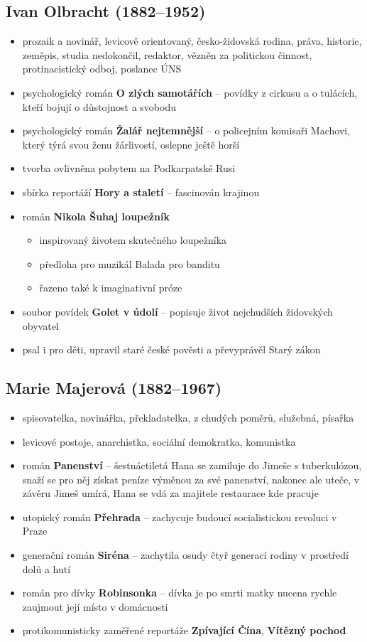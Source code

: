\subsection{Ivan Olbracht (1882--1952)}
\begin{itemize}
\item prozaik a novinář, levicově orientovaný, česko-židovská rodina, práva, historie, zeměpis, studia nedokončil, redaktor, vězněn za politickou činnost, protinacistický odboj, poslanec ÚNS
\item psychologický román \textbf{O zlých samotářích} -- povídky z cirkusu a o tulácích, kteří bojují o důstojnost a svobodu
\item psychologický román \textbf{Žalář nejtemnější} -- o policejním komisaři Machovi, který týrá svou ženu žárlivostí, oslepne \ra ještě horší
\item tvorba ovlivněna pobytem na Podkarpatské Rusi
\item sbírka reportáží \textbf{Hory a staletí} -- fascinován krajinou
\item román \textbf{Nikola Šuhaj loupežník}
	\begin{itemize}
	\item inspirovaný životem skutečného loupežníka
	\item předloha pro muzikál Balada pro banditu
	\item řazeno také k imaginativní próze
	\end{itemize}
\item soubor povídek \textbf{Golet v údolí} -- popisuje život nejchudších židovských obyvatel
\item psal i pro děti, upravil staré české pověsti a převyprávěl Starý zákon
\end{itemize}

\subsection{Marie Majerová (1882--1967)}
\begin{itemize}
\item spisovatelka, novinářka, překladatelka, z chudých poměrů, služebná, písařka
\item levicové postoje, anarchistka, sociální demokratka, komunistka
\item román \textbf{Panenství} -- šestnáctiletá Hana se zamiluje do Jimeše s tuberkulózou, snaží se pro něj získat peníze výměnou za své panenství, nakonec ale uteče, v závěru Jimeš umírá, Hana se vdá za majitele restaurace kde pracuje
\item utopický román \textbf{Přehrada} -- zachycuje budoucí socialistickou revoluci v Praze
\item generační román \textbf{Siréna} -- zachytila osudy čtyř generací rodiny v prostředí dolů a hutí
\item román pro dívky \textbf{Robinsonka} -- dívka je po smrti matky nucena rychle zaujmout její místo v domácnosti
\item protikomunisticky zaměřené reportáže \textbf{Zpívající Čína}, \textbf{Vítězný pochod}
\end{itemize}


